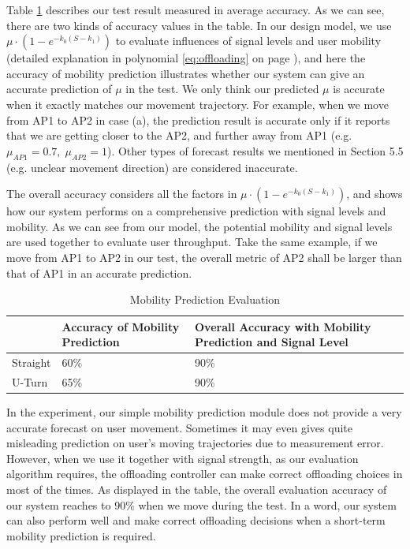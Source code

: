 \documentclass[english]{tktltiki}
\begin{document}
Table \ref{tab:mobility} describes our test result measured in average accuracy. As we can see, there are two kinds of accuracy values in the table. In our design model, we use $\mu \cdot (1 - e^{-k_0(S - k_1)})$ to evaluate influences of signal levels and user mobility (detailed explanation in polynomial \ref{eq:offloading} on page \pageref{eq:offloading}), and here the accuracy of mobility prediction illustrates whether our system can give an accurate prediction of $\mu$ in the test. We only think our predicted $\mu$ is accurate when it exactly matches our movement trajectory. For example, when we move from AP1 to AP2 in case (a), the prediction result is accurate only if it reports that we are getting closer to the AP2, and further away from AP1 (e.g. ${\mu}_{AP1} = 0.7,\; {\mu}_{AP2} = 1$). Other types of forecast results we mentioned in Section 5.5 (e.g. unclear movement direction) are considered inaccurate. 

The overall accuracy considers all the factors in $\mu \cdot (1 - e^{-k_0(S - k_1)})$, and shows how our system performs on a comprehensive prediction with signal levels and mobility. As we can see from our model, the potential mobility and signal levels are used together to evaluate user throughput. Take the same example, if we move from AP1 to AP2 in our test, the overall metric of AP2 shall be larger than that of AP1 in an accurate prediction. 

\begin{table}
  \centering
  \begin{tabular}{|p{50pt}|p{120pt}|p{150pt}|}
    \hline
    & Accuracy of Mobility Prediction & Overall Accuracy with Mobility Prediction and Signal Level \\    
    \hline
    Straight & 60\% & 90\% \\
    \hline
    U-Turn & 65\% & 90\% \\
    \hline
  \end{tabular}
  \caption{Mobility Prediction Evaluation}
  \label{tab:mobility}
\end{table}


In the experiment, our simple mobility prediction module does not provide a very accurate forecast on user movement. Sometimes it may even gives quite misleading prediction on user's moving trajectories due to measurement error. However, when we use it together with signal strength, as our evaluation algorithm requires, the offloading controller can make correct offloading choices in most of the times. As displayed in the table, the overall evaluation accuracy of our system reaches to 90\% when we move during the test. In a word, our system can also perform well and make correct offloading decisions when a short-term mobility prediction is required.
\end{document}
